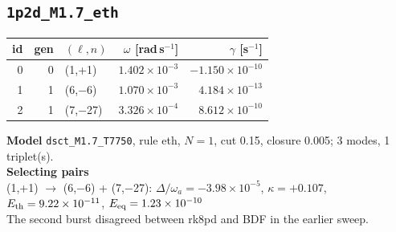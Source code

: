 \clearpage
\subsection{\texttt{1p2d\_M1.7\_eth}}\label{net:1p2d_M1.7_eth}
\noindent\begin{minipage}[t]{0.43\textwidth}\vspace{0pt}\footnotesize
\begin{tabular}{@{}rrlrr@{}}
\toprule
id & gen & $(\ell,n)$ & $\omega$ [rad\,s$^{-1}$] & $\gamma$ [s$^{-1}$] \\
\midrule
0 & 0 & (1,+1) & $1.402\times10^{-3}$ & $-1.150\times10^{-10}$ \\
1 & 1 & (6,$-$6) & $1.070\times10^{-3}$ & $4.184\times10^{-13}$ \\
2 & 1 & (7,$-$27) & $3.326\times10^{-4}$ & $8.612\times10^{-10}$ \\
\bottomrule
\end{tabular}
\end{minipage}\hfill
\begin{minipage}[t]{0.55\textwidth}\vspace{0pt}\footnotesize
\textbf{Model} \texttt{dsct\_M1.7\_T7750}, rule eth, $N=1$, cut 0.15,
closure 0.005; 3 modes, 1 triplet(s).\\[2pt]
\textbf{Selecting pairs}\\ (1,+1) $\to$ (6,$-$6) + (7,$-$27): $\Delta/\omega_a=-3.98\times10^{-5}$, $\kappa=+0.107$, $E_{\rm th}=9.22\times10^{-11}$, $E_{\rm eq}=1.23\times10^{-10}$\\[2pt]
The second burst disagreed between rk8pd and BDF in the earlier sweep.
\end{minipage}

